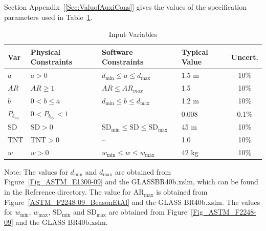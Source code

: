 \documentclass[12pt]{article}
\begin{document}
Section Appendix~[\ref{Sec:ValuofAuxiCons}]   
gives the values of the specification parameters used in
Table~\ref{TblInputVar}.

\begin{table}[!h]
\caption{Input Variables} \label{TblInputVar}
\renewcommand{\arraystretch}{1.2}
\begin{tabular}{l l l l c} 
\toprule
\textbf{Var} & \textbf{Physical Constraints} & \textbf{Software Constraints} & \textbf{Typical Value} & \textbf{Uncert.} \\
\midrule 
$a$&$a > 0 $ & $d_{\text{min}} \leq a \leq d_{\text{max}}$ 
                           & 1.5 \si[per-mode=symbol] {\metre}& 10\%\\

$AR$& $AR \geq 1$ & $AR \leq AR_{max}$ & 1.5 & 10\%\\
                           
$b$&$0 < b \leq a$ & $d_{\text{min}} \leq b \leq d_{\text{max}}$ 
                           & 1.2 \si[per-mode=symbol]{\metre}& 10\%\\
 
$P_{b_{\text{tol}}}$& $0 < P_{b_{\text{tol}}} < 1$& --& 0.008 &0.1\%\\

$\text{SD}$&$\text{SD}>0$&$\text{SD}_{\text{min}} \leq \text{SD} \leq \text{SD}_{\text{max}}$&45
\si[per-mode=symbol]{\meter}&10\%\\

$\text{TNT}$&$\text{TNT}>0$&--&1.0&10\%\\


$w$&$w > 0$ & $w_{\text{min}} \le w \le w_{\text{max}}$&42 \si[per-mode=symbol]{\kilo\gram}&10\%\\

\bottomrule
\end{tabular}
\end{table}

Note: The values for $d_\text{min}$ and $d_\text{max}$ are obtained from
Figure~\ref{Fig_ASTM_E1300-09} and the GLASS\textunderscore BR\textunderscore 40b.xslm, which can be found in the Reference directory. The
value for $\mbox{AR}_\text{max}$ is obtained from
Figure~\ref{ASTM_F2248-09_BeasonEtAl} and the GLASS\textunderscore
BR\textunderscore 40b.xslm.  The values for $w_\text{min}$,
$w_\text{max}$, $\text{SD}_\text{min}$ and $\text{SD}_\text{max}$ are obtained
from Figure~\ref{Fig_ASTM_F2248-09} and the GLASS\textunderscore
BR\textunderscore 40b.xslm.  \newline
\end{document}
